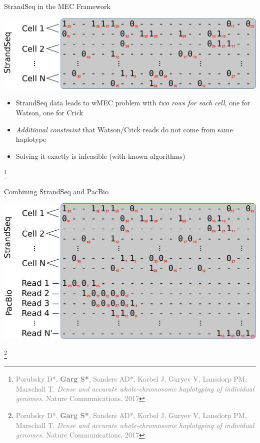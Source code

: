 \documentclass[notes=hide]{beamer}
\begin{document}
\begin{frame}{StrandSeq in the MEC Framework}
\begin{center}
\includegraphics[width=\textwidth]{figs/strandseq}
\end{center}
\begin{block}{}
\begin{itemize}
 \item StrandSeq data leads to wMEC problem with \emph{two rows for each cell}, one for Watson, one for Crick
 \item \emph{Additional constraint} that Watson/Crick reads do not come from same haplotype
 \item Solving it exactly is infeasible (with known algorithms)
\end{itemize}
\end{block}
\let\thefootnote\relax\footnote{\tiny\textcolor{gray}{Porubsky D*, \textbf{Garg S*}, Sanders AD*, Korbel J, Guryev V, Lansdorp PM, Marschall T. \textit{Dense and accurate whole-chromosome haplotyping of individual genomes}. Nature Communications. 2017}}
\end{frame}

\begin{frame}{Combining StrandSeq and PacBio}
\begin{center}
\includegraphics[width=\textwidth]{figs/strandseq-plus-pacbio}
\end{center}
\let\thefootnote\relax\footnote{\tiny\textcolor{gray}{Porubsky D*, \textbf{Garg S*}, Sanders AD*, Korbel J, Guryev V, Lansdorp PM, Marschall T. \textit{Dense and accurate whole-chromosome haplotyping of individual genomes}. Nature Communications. 2017}}
\end{frame}
\end{document}
